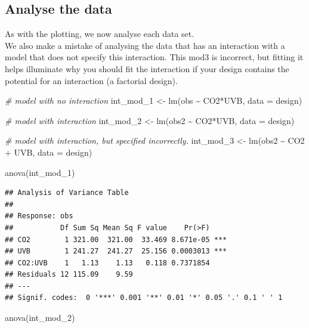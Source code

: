 \documentclass[
]{book}
\newenvironment{Shaded}{\begin{snugshade}}{\end{snugshade}}
\newcommand{\AttributeTok}[1]{\textcolor[rgb]{0.77,0.63,0.00}{#1}}
\newcommand{\CommentTok}[1]{\textcolor[rgb]{0.56,0.35,0.01}{\textit{#1}}}
\newcommand{\FunctionTok}[1]{\textcolor[rgb]{0.00,0.00,0.00}{#1}}
\newcommand{\NormalTok}[1]{#1}
\newcommand{\OtherTok}[1]{\textcolor[rgb]{0.56,0.35,0.01}{#1}}
\newcommand{\SpecialCharTok}[1]{\textcolor[rgb]{0.00,0.00,0.00}{#1}}
\begin{document}
\hypertarget{analyse-the-data}{%
\subsection{Analyse the data}\label{analyse-the-data}}

As with the plotting, we now analyse each data set.\\
We also make a mistake of analysing the data that has an interaction with a model that does not specify this interaction. This mod3 is incorrect, but fitting it helps illuminate why you should fit the interaction if your design contains the potential for an interaction (a factorial design).

\begin{Shaded}
\begin{Highlighting}[]
\CommentTok{\# model with no interaction}
\NormalTok{int\_mod\_1 }\OtherTok{\textless{}{-}} \FunctionTok{lm}\NormalTok{(obs }\SpecialCharTok{\textasciitilde{}}\NormalTok{ CO2}\SpecialCharTok{*}\NormalTok{UVB, }\AttributeTok{data =}\NormalTok{ design)}

\CommentTok{\# model with interaction}
\NormalTok{int\_mod\_2 }\OtherTok{\textless{}{-}} \FunctionTok{lm}\NormalTok{(obs2 }\SpecialCharTok{\textasciitilde{}}\NormalTok{ CO2}\SpecialCharTok{*}\NormalTok{UVB, }\AttributeTok{data =}\NormalTok{ design)}

\CommentTok{\# model with interaction, but specified incorrectly.}
\NormalTok{int\_mod\_3 }\OtherTok{\textless{}{-}} \FunctionTok{lm}\NormalTok{(obs2 }\SpecialCharTok{\textasciitilde{}}\NormalTok{ CO2 }\SpecialCharTok{+}\NormalTok{ UVB, }\AttributeTok{data =}\NormalTok{ design)}

\FunctionTok{anova}\NormalTok{(int\_mod\_1)}
\end{Highlighting}
\end{Shaded}

\begin{verbatim}
## Analysis of Variance Table
## 
## Response: obs
##           Df Sum Sq Mean Sq F value    Pr(>F)    
## CO2        1 321.00  321.00  33.469 8.671e-05 ***
## UVB        1 241.27  241.27  25.156 0.0003013 ***
## CO2:UVB    1   1.13    1.13   0.118 0.7371854    
## Residuals 12 115.09    9.59                      
## ---
## Signif. codes:  0 '***' 0.001 '**' 0.01 '*' 0.05 '.' 0.1 ' ' 1
\end{verbatim}

\begin{Shaded}
\begin{Highlighting}[]
\FunctionTok{anova}\NormalTok{(int\_mod\_2)}
\end{Highlighting}
\end{Shaded}
\end{document}
